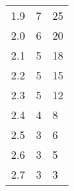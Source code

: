 \begin{table}[H]
{\begin{tabular}{|l|l|l|}
1.9                      & 7                                                                                                                   & 25                                                                                                                 \\
2.0                      & 6                                                                                                                   & 20                                                                                                                 \\
2.1                      & 5                                                                                                                   & 18                                                                                                                 \\
2.2                      & 5                                                                                                                   & 15                                                                                                                 \\
2.3                      & 5                                                                                                                   & 12                                                                                                                 \\
2.4                      & 4                                                                                                                   & 8                                                                                                                  \\
2.5                      & 3                                                                                                                   & 6                                                                                                                  \\
2.6                      & 3                                                                                                                   & 5                                                                                                                  \\
2.7                      & 3                                                                                                                   & 3                                                                                                                  \\

\end{tabular}}
\end{table}
